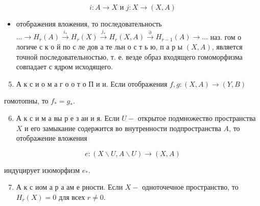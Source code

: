 \documentclass[10pt]{article}
\begin{document}
\[

i: A \rightarrow X \text { и } j: X \rightarrow(X, A)

\]



\begin{itemize}

  \item отображения вложения, то последовательность $\ldots \longrightarrow H_{r}(A) \stackrel{i_{*}}{\longrightarrow} H_{r}(X) \stackrel{j_{*}}{\longrightarrow} H_{r}(X, A) \stackrel{\partial}{\longrightarrow} H_{r-1}(A) \longrightarrow \ldots$ наз. гом о логиче с к о й по с ле дов а те льн о с т ь ю, п а р ы $(X, A)$, является точной последовательностью, т. е. везде образ входящего гомоморфизма совпадает с ядром исходящего.

\end{itemize}



\begin{enumerate}

  \setcounter{enumi}{4}

  \item А к с и о м а г о о т о П и и. Если отображения $f, g:(X, A) \rightarrow(Y, B)$

\end{enumerate}



гомотопны, то $f_{*}=g_{*}$.



\begin{enumerate}

  \setcounter{enumi}{5}

  \item А к с и м а вы р е з ан и я. Если $U-$ открытое подмножество пространства $X$ и его замыкание содержится во внутренности подпространства $A$, то отображение вложения

\end{enumerate}



\[

e:(X \backslash U, A \backslash U) \longrightarrow(X, A)

\]



индуцирует изоморфизм $e_{*}$.



\begin{enumerate}

  \setcounter{enumi}{6}

  \item А к с иом а р а $а м$ е рности. Если $X-$ одноточечное пространство, то $H_{r}(X)=0$ для всех $r \neq 0$.

\end{enumerate}
\end{document}
